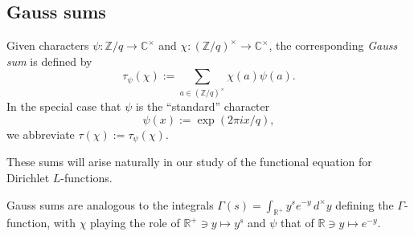 \documentclass[reqno]{amsart}  \numberwithin{theorem}{section} \numberwithin{equation}{section}
\begin{document}
\subsection{Gauss sums}\label{sec:cj57ckemom}
Given characters $\psi : \mathbb{Z} / q \rightarrow \mathbb{C}^\times$ and $\chi : (\mathbb{Z} / q )^\times \rightarrow \mathbb{C}^\times$, the corresponding \emph{Gauss sum} is defined by
\begin{equation*}
  \tau _\psi (\chi ) := \sum_{a \in (\mathbb{Z} / q )^\times }
  \chi (a) \psi (a).
\end{equation*}
In the special case that $\psi$ is the ``standard'' character
\begin{equation}\label{eq:cj57b8om3u}
  \psi(x) := \exp (2 \pi i x / q),
\end{equation}
we abbreviate $\tau (\chi ) := \tau_\psi (\chi)$.

These sums will arise naturally in our study of the functional equation for Dirichlet $L$-functions.

\begin{remark}\label{remark:cj57ckekc3}
Gauss sums are analogous to the integrals $\Gamma(s) = \int_{\mathbb{R}^+ } y^s e^{- y } \,d^\times y$ defining the $\Gamma$-function, with $\chi$ playing the role of $\mathbb{R}^+ \ni y \mapsto y^s$ and $\psi$ that of $\mathbb{R} \ni y \mapsto e^{-y}$.  
\end{remark}
\end{document}
